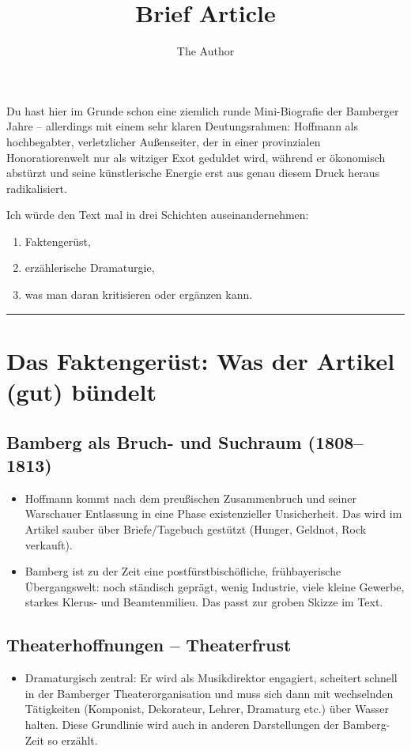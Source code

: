 \documentclass[11pt]{amsart}
\title{Brief Article}
\author{The Author}
\date{} %
\begin{document}
\maketitle

Du hast hier im Grunde schon eine ziemlich \glqq runde\grqq{} Mini-Biografie der Bamberger Jahre -- allerdings mit einem sehr klaren Deutungsrahmen: Hoffmann als hochbegabter, verletzlicher Au{\ss}enseiter, der in einer provinzialen Honoratiorenwelt nur als witziger Exot geduldet wird, w\"ahrend er \"okonomisch abst\"urzt und seine k\"unstlerische Energie erst aus genau diesem Druck heraus radikalisiert.

Ich w\"urde den Text mal in drei Schichten auseinandernehmen:
\begin{enumerate}
  \item Faktenger\"ust,
  \item erz\"ahlerische Dramaturgie,
  \item was man daran kritisieren oder erg\"anzen kann.
\end{enumerate}

\bigskip
\hrule
\bigskip

\section{Das Faktenger\"ust: Was der Artikel (gut) b\"undelt}

\subsection{Bamberg als Bruch- und Suchraum (1808--1813)}
\begin{itemize}
  \item Hoffmann kommt nach dem preu{\ss}ischen Zusammenbruch und seiner Warschauer Entlassung in eine Phase existenzieller Unsicherheit. Das wird im Artikel sauber \"uber Briefe/Tagebuch gest\"utzt (Hunger, Geldnot, \glqq Rock verkauft\grqq).
  \item Bamberg ist zu der Zeit eine postf\"urstbisch\"ofliche, fr\"uhbayerische \"Ubergangswelt: noch st\"andisch gepr\"agt, wenig Industrie, viele kleine Gewerbe, starkes Klerus- und Beamtenmilieu. Das passt zur groben Skizze im Text.
\end{itemize}

\subsection{Theaterhoffnungen -- Theaterfrust}
\begin{itemize}
  \item Dramaturgisch zentral: Er wird als Musikdirektor engagiert, scheitert schnell in der Bamberger Theaterorganisation und muss sich dann mit wechselnden T\"atigkeiten (Komponist, Dekorateur, Lehrer, Dramaturg etc.) \"uber Wasser halten. Diese Grundlinie wird auch in anderen Darstellungen der Bamberg-Zeit so erz\"ahlt.
\end{itemize}
\end{document}
